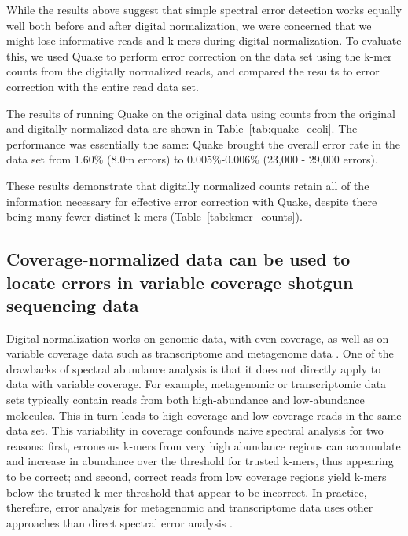 \documentclass{article}
\begin{document}
While the results above suggest that simple spectral error detection
works equally well both before and after digital normalization, we
were concerned that we might lose informative reads and k-mers during
digital normalization.  To evaluate this, we used Quake to perform
error correction on the data set using the k-mer counts from the
digitally normalized reads, and compared the results to error
correction with the entire read data set.

The results of running Quake on the original data using counts from
the original and digitally normalized data are shown in
Table~\ref{tab:quake_ecoli}.  The performance was essentially the
same: Quake brought the overall error rate in the data set from 1.60\%
(8.0m errors) to 0.005\%-0.006\% (23,000 - 29,000 errors).

These results demonstrate that digitally normalized counts retain all
of the information necessary for effective error correction with
Quake, despite there being many fewer distinct k-mers
(Table~\ref{tab:kmer_counts}).

%

\subsection{Coverage-normalized data can be used to locate errors in variable
coverage shotgun sequencing data}

Digital normalization works on genomic data, with even coverage, as
well as on variable coverage data such as transcriptome and metagenome
data \cite{Brown2012, Lowe2015}. One of the drawbacks of spectral
abundance analysis is that it does not directly apply to data with
variable coverage.  For example, metagenomic or transcriptomic data
sets typically contain reads from both high-abundance and
low-abundance molecules.  This in turn leads to high coverage and low
coverage reads in the same data set. This variability in coverage
confounds naive spectral analysis for two reasons: first, erroneous
k-mers from very high abundance regions can accumulate and increase in
abundance over the threshold for trusted k-mers, thus appearing to be
correct; and second, correct reads from low coverage regions yield
k-mers below the trusted k-mer threshold that appear to be incorrect.
In practice, therefore, error analysis for metagenomic and
transcriptome data uses other approaches than direct spectral error
analysis \cite{Medvedev2011,others}.
\end{document}
